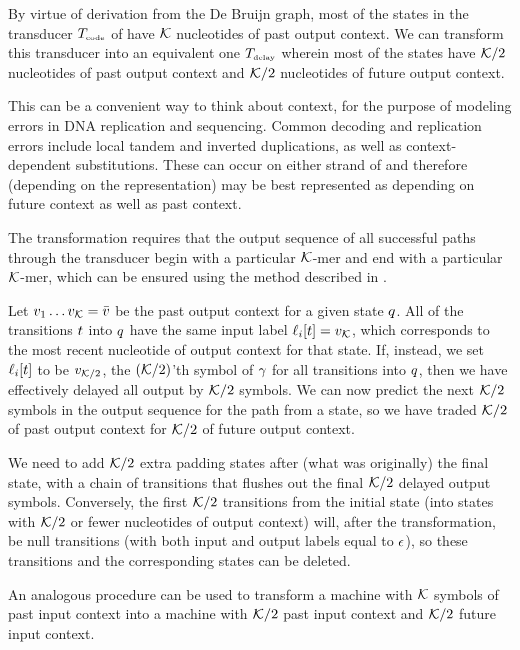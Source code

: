 \documentclass[english]{article}
\begin{document}
By virtue of derivation from the De Bruijn graph,
most of the states in the transducer $T_{\mbox{\tiny code}}$ of 
have ${\cal K}$ nucleotides of past output context.
We can transform this transducer into an equivalent one $T_{\mbox{\tiny delay}}$ wherein most of the states have
${\cal K}/2$ nucleotides of past output context
and ${\cal K}/2$ nucleotides of future output context.

This can be a convenient way to think about context, for the purpose of modeling errors in DNA replication and sequencing.
Common decoding and replication errors include local tandem and inverted duplications, as well as context-dependent substitutions.
These can occur on either strand of and therefore (depending on the representation) may be best represented as depending
on future context as well as past context.

The transformation requires that the output sequence of all successful paths through the transducer
begin with a particular ${\cal K}$-mer and end with a particular ${\cal K}$-mer,
which can be ensured using the method described in .

Let $v_{1} \ldots v_{{\cal K}} = \bar{v}$ be the past output context for a given state $q$.
All of the transitions $t$ into $q$ have the same input label $\ell_i[t] = v_{{\cal K}}$,
which corresponds to the most recent nucleotide of output context for that state.
If, instead, we set $\ell_i[t]$ to be $v_{{\cal K}/2}$, the $({\cal K}/2)$'th symbol of $\gamma$
for all transitions into $q$, then we have effectively delayed all output by ${\cal K}/2$ symbols.
We can now predict the next ${\cal K}/2$ symbols in the output sequence for the path from a state,
so we have traded ${\cal K}/2$ of past output context for ${\cal K}/2$ of future output context.

We need to add ${\cal K}/2$ extra padding states after (what was originally) the final state,
with a chain of transitions that flushes out the final ${\cal K}/2$ delayed output symbols.
Conversely, the first ${\cal K}/2$ transitions from the initial state
(into states with ${\cal K}/2$ or fewer nucleotides of output context)
will, after the transformation,
be null transitions (with both input and output labels equal to $\epsilon$),
so these transitions and the corresponding states can be deleted.

An analogous procedure can be used to transform a machine with ${\cal K}$ symbols of past input context
into a machine with ${\cal K}/2$ past input context and ${\cal K}/2$ future input context.
\end{document}
